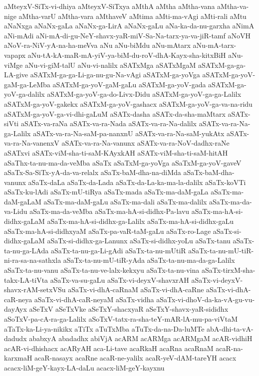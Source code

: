 {aMteyxV-SiTx-vi-dhiya
aMteyxV-SiTxya
aMthA
aMtha
aMtha-vana
aMtha-va-nige
aMtha-varU
aMtha-vara
aMthaveV
aMtima
aMti-ma-vAgi
aMti-rali
aMtu
aNaNxga
aNaNx-gaLa
aNaNx-ga-LirA
aNaNx-gaLu
aNa-ka-da-nu-garxha
aNimA
aNi-mAdi
aNi-mA-di-gu-NeY-shavx-yaR-miV-Sa-Na-tarx-ya-va-jiR-tamf
aNoVH
aNoV-ra-NiV-yA-na-ha-meVva
aNu
aNu-biMdu
aNu-mAtarx
aNu-mA-tarx-vapapx
aNu-tA-kA-maR-mA-yiV-ya-biM-du-roV-dhA-Kayx-sha-kitxBiH
aNu-viMge
aNu-vi-giM-talU
aNu-vi-nalilx
aSATxMga
aSATxMgaM
aSATxM-ga-ga-LA-give
aSATxM-ga-ga-Li-ga-nu-gu-Na-vAgi
aSATxM-ga-yoVga
aSATxM-ga-yoV-gaM-ga-LeMba
aSATxM-ga-yoV-gaM-gaLu
aSATxM-ga-yoV-gada
aSATxM-ga-yoV-ga-dalilx
aSATxM-ga-yoV-ga-do-Livx-Didu
aSATxM-ga-yoV-ga-ga-Lalilx
aSATxM-ga-yoV-gakekx
aSATxM-ga-yoV-gashacx
aSATxM-ga-yoV-ga-va-na-ridu
aSATxM-ga-yoV-ga-vi-dhi-gaLuM
aSATx-dasha
aSATx-da-sha-maMtarx
aSATx-siVti
aSATx-va-raNa
aSATx-va-ra-Nada
aSATx-va-ra-Na-dalilx
aSATx-va-ra-Na-ga-Lalilx
aSATx-va-ra-Na-saM-pa-nanxnU
aSATx-va-ra-Na-saM-yukAtx
aSATx-va-ra-Na-vanenxV
aSATx-va-ra-Na-vanunx
aSATx-va-ra-NoV-dadhx-raNe
aSATxvi
aSATx-viM-sha-ti-saM-KAyxkAH
aSATx-viM-sha-ti-saM-hitAH
aSaThx-ta-nu-ma-da-veMba
aSaTx
aSaTxM-ga-yoVga
aSaTxM-ga-yoV-gaveV
aSaTx-Sa-SiTx-yA-da-va-relalx
aSaTx-baM-dha-na-diMda
aSaTx-baM-dha-vanunx
aSaTx-daLa
aSaTx-da-Lada
aSaTx-da-La-ka-ma-la-dalilx
aSaTx-koVTi
aSaTx-ku-lAdi
aSaTx-mU-tiRya
aSaTx-mada
aSaTx-ma-daM-gaLa
aSaTx-ma-daM-gaLaM
aSaTx-ma-daM-gaLu
aSaTx-ma-dali
aSaTx-ma-dalilx
aSaTx-ma-da-va-Lidu
aSaTx-ma-da-veMba
aSaTx-ma-hA-si-didhx-Pa-lavu
aSaTx-ma-hA-si-didhx-gaLaM
aSaTx-ma-hA-si-didhx-ga-Lalilx
aSaTx-ma-hA-si-didhx-gaLu
aSaTx-ma-hA-si-didhxyaM
aSaTx-pa-vaR-taM-gaLu
aSaTx-ro-Lage
aSaTx-si-didhx-gaLaM
aSaTx-si-didhx-ga-Lanunx
aSaTx-si-didhx-yoLu
aSaTx-tanu
aSaTx-ta-nu-ga-LAda
aSaTx-ta-nu-ga-Li-gAdi
aSaTx-ta-nu-mUtiR
aSaTx-ta-nu-mU-tiR-ni-ra-sa-na-sathxla
aSaTx-ta-nu-mU-tiR-yAda
aSaTx-ta-nu-ma-da-ga-Lalilx
aSaTx-ta-nu-vanu
aSaTx-ta-nu-ve-lalx-kekxyu
aSaTx-ta-nu-vina
aSaTx-tirxM-sha-takx-LA-tiVta
aSaTx-va-su-gaLu
aSaTx-vi-deyxV-shavxrAH
aSaTx-vi-deyxV-shavx-rAM-setxVSu
aSaTx-vi-dhA-caRnaM
aSaTx-vi-dhA-caRne
aSaTx-vi-dhA-caR-neya
aSaTx-vi-dhA-caR-neyaM
aSaTx-vidha
aSaTx-vi-dhoV-da-ka-vA-gu-vu-dayAyx
aSeTxV
aSeTxVke
aSeTxY-shacxyaR
aSeTxY-shavx-yaR-sididhx
aSoTxV-pa-cA-ra-ga-Lalilx
aSoTxV-tatx-ra-sha-teY-mAR-lA-mu-pa-viVtaM
aTaTx-ka-Li-ya-nikikx
aTiTx
aTuTxMba
aTuTx-da-na-Da-luMTe
abA-dhi-ta-vA-dadudx
ababxyA
abadadhx
abiVjA
acARM
acARMga
acARMgaM
acAR-vidhiH
acAR-vi-dhishacx
acARyAH
aca-Li-tave
acaRkaH
acaRna
acaRnaM
acaR-na-karxmaH
acaR-nasayx
acaRne
acaR-ne-yalilx
acaR-yeV-dAM-tareYH
acacx
acacx-liM-geY-kayx-LA-daLu
acacx-liM-geY-kayxnu
}
